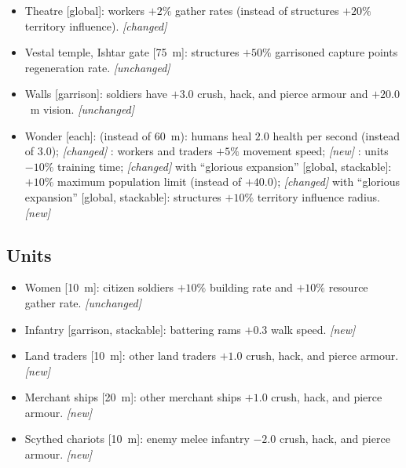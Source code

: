 \documentclass{article}
\begin{document}
\begin{itemize}
  \item Theatre [global]: workers $+2\%$ gather rates (instead of structures $+20\%$ territory influence). \emph{[changed]}
  \item Vestal temple, Ishtar gate [75~m]: structures $+50\%$ garrisoned capture points regeneration rate. \emph{[unchanged]}
  \item Walls [garrison]: soldiers have $+3.0$ crush, hack, and pierce armour and $+20.0$~m vision. \emph{[unchanged]}
  \item Wonder [each]:
  \subitem [50~m] (instead of 60~m): humans heal $2.0$ health per second (instead of $3.0$); \emph{[changed]}
  \subitem [100~m]: workers and traders $+5\%$ movement speed; \emph{[new]}
  : units $-10\%$ training time; \emph{[changed]}
  \subitem with ``glorious expansion'' [global, stackable]: $+10\%$ maximum population limit (instead of $+40.0$); \emph{[changed]}
  \subitem with ``glorious expansion'' [global, stackable]: structures $+10\%$ territory influence radius. \emph{[new]}
\end{itemize}


\subsection{Units}
\begin{itemize}
  \item Women [10~m]: citizen soldiers $+10\%$ building rate and $+10\%$ resource gather rate. \emph{[unchanged]}
  \item Infantry [garrison, stackable]: battering rams $+0.3$ walk speed. \emph{[new]}
  \item Land traders [10~m]: other land traders $+1.0$ crush, hack, and pierce armour. \emph{[new]}
  \item Merchant ships [20~m]: other merchant ships $+1.0$ crush, hack, and pierce armour. \emph{[new]}
  \item Scythed chariots [10~m]: enemy melee infantry $-2.0$ crush, hack, and pierce armour. \emph{[new]}
\end{itemize}
\end{document}
